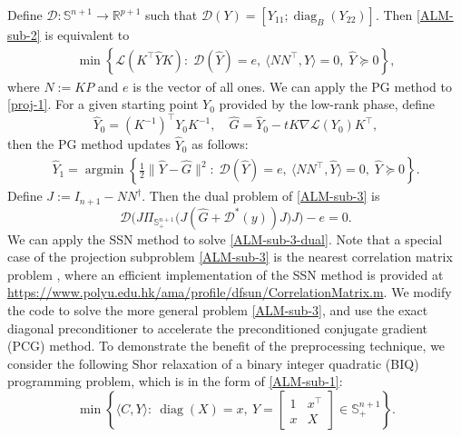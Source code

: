 \documentclass[11pt]{article}
\theoremstyle{plain}
\def\<{\big\langle}
\def\>{\big\rangle}
\def\L{\mathcal{L}}
\def\R{\mathbb{R}}
\def\S{\mathbb{S}}
\DeclareMathOperator{\diag}{diag}
\begin{document}
Define $\mathcal{D}: \S^{n+1}\rightarrow \R^{p+1}$ such that $\mathcal{D}(Y)=[Y_{11};\diag_B(Y_{22})]$. 
Then \eqref{ALM-sub-2} is equivalent to
\begin{equation}\label{proj-1}
\begin{aligned}
    \min \left\{ \L(K^\top \widehat{Y}K) :  \; \mathcal{D}(\widehat{Y})=e,\ \langle NN^\top, \widehat{Y} \rangle = 0, \; \widehat{Y} \succeq 0 \right\},
\end{aligned}
\end{equation}
where $N:=KP$ and $e$ is the vector of all ones. We can {apply the PG method to \eqref{proj-1}}. For a given starting point ${Y_0}$ provided by the low-rank phase, define 
\[
\widehat{Y}_0=(K^{-1})^\top {Y_0}K^{-1},\quad \widehat{G}=\widehat{Y}_0-tK\nabla \L({Y}_0)K^\top,
\]
then the PG method updates $\widehat{Y}_0$ as follows: 
\begin{equation}\label{ALM-sub-3}
\begin{aligned}
    \widehat{Y}_1 =\operatorname{argmin} \left\{ \frac{1}{2}\|\widehat{Y}-\widehat{G}\|^2 :  \; \mathcal{D}(\widehat{Y})=e,\ \langle NN^\top, \widehat{Y} \rangle = 0, \; \widehat{Y} \succeq 0 \right\}.
\end{aligned}
\end{equation}
Define $J:=I_{n+1}-NN^\dagger$. Then the dual problem of \eqref{ALM-sub-3} is
\begin{equation}\label{ALM-sub-3-dual}%
\mathcal{D}\big( J\Pi_{\S^{n+1}_+}\big(J(\widehat{G}+\mathcal{D}^*(y))J\big)J\big)-e=0.
\end{equation}
We can apply the SSN method to solve \eqref{ALM-sub-3-dual}. Note that a special case of the projection subproblem \eqref{ALM-sub-3} is the nearest correlation matrix problem \cite{qi2006quadratically}, where an efficient implementation of the SSN method is provided at \url{https://www.polyu.edu.hk/ama/profile/dfsun/CorrelationMatrix.m}. We modify the code to solve the more general problem \eqref{ALM-sub-3}, and use the exact diagonal preconditioner to accelerate the preconditioned conjugate gradient (PCG) method. To demonstrate the benefit of the preprocessing technique, we consider the following Shor relaxation of a binary integer quadratic (BIQ) programming problem, which is in the form of \eqref{ALM-sub-1}:
\begin{equation}\label{shor-biq-without-pre}
\min\left\{\< C,Y\>:\ \diag(X)=x,\ Y=\begin{bmatrix}
    1&x^\top\\x&X \end{bmatrix}\in\S^{n+1}_+ \right\}.
\end{equation}
\end{document}
